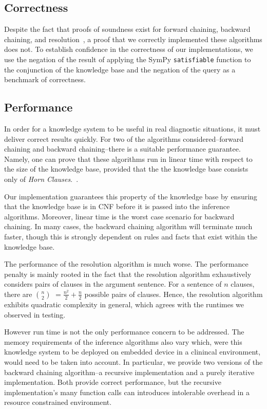 \documentclass[12pt, conference, compsocconf]{IEEEtran}
\begin{document}
\subsection{Correctness}
Despite the fact that proofs of soundness exist for forward chaining, backward chaining, and resolution~\cite{russell-norvig-aima}, a proof that we correctly implemented these algorithms does not. 
To establish confidence in the correctness of our implementations, we use the negation of the result of applying the SymPy \texttt{satisfiable} function to the conjunction of the knowledge base and the negation of the query as a benchmark of correctness. 


\subsection{Performance}
In order for a knowledge system to be useful in real diagnostic situations, it must deliver correct results quickly. 
For two of the algorithms considered--forward chaining and backward chaining--there is a suitable performance guarantee. 
Namely, one can prove that these algorithms run in linear time with respect to the size of the knowledge base, provided that the the knowledge base consists only of \emph{Horn Clauses}.~\cite{russell-norvig-aima}. 

Our implementation guarantees this property of the knowledge base by ensuring that the knowledge base is in CNF before it is passed into the inference algorithms. 
Moreover, linear time is the worst case scenario for backward chaining. 
In many cases, the backward chaining algorithm will terminate much faster, though this is strongly dependent on rules and facts that exist within the knowledge base. 

The performance of the resolution algorithm is much worse. 
The performance penalty is mainly rooted in the fact that the resolution algorithm exhaustively considers pairs of clauses in the argument sentence. 
For a sentence of $n$ clauses, there are $n \choose 2$ $= \frac{n^2}{2} + \frac{n}{2}$ possible pairs of clauses. 
Hence, the resolution algorithm exhibits quadratic complexity in general, which agrees with the runtimes we observed in testing. 

However run time is not the only performance concern to be addressed. 
The memory requirements of the inference algorithms also vary which, were this knowledge system to be deployed on embedded device in a clinincal environment, would need to be taken into account. 
In particular, we provide two versions of the backward chaining algorithm--a recursive implementation and a purely iterative implementation. 
Both provide correct performance, but the recursive implementation's many function calls can introduces intolerable overhead in a resource constrained environment. 
\end{document}

